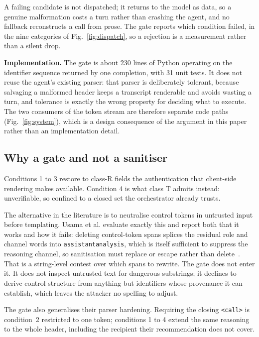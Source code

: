 \documentclass[conference]{IEEEtran}
\newcommand{\hmtok}[1]{\texttt{\textless\textbar#1\textbar\textgreater}}
\begin{document}
A failing candidate is not dispatched; it returns to the model as data, so a
genuine malformation costs a turn rather than crashing the agent, and no
fallback reconstructs a call from prose. The gate reports which condition
failed, in the nine categories of Fig.~\ref{fig:dispatch}, so a rejection is a
measurement rather than a silent drop.

\textbf{Implementation.} The gate is about 230 lines of Python operating on the
identifier sequence returned by one completion, with 31 unit tests. It does
not reuse the agent's existing parser: that parser is deliberately tolerant,
because salvaging a malformed header keeps a transcript renderable and avoids
wasting a turn, and tolerance is exactly the wrong property for deciding what to
execute. The two consumers of the token stream are therefore separate code
paths (Fig.~\ref{fig:system}), which is a design consequence of the argument in
this paper rather than an implementation detail.

\subsection{Why a gate and not a sanitiser}

Conditions 1 to 3 restore to class-R fields the authentication that client-side
rendering makes available. Condition 4 is what class T admits instead:
unverifiable, so confined to a closed set the orchestrator already trusts.

The alternative in the literature is to neutralise control tokens in untrusted
input before templating. Usama et al. evaluate exactly this and report both that
it works and how it fails: deleting control-token spans splices the residual
role and channel words into \texttt{assistantanalysis}, which is itself
sufficient to suppress the reasoning channel, so sanitisation must replace or
escape rather than delete~\cite{usama2026controltoken}. That is a string-level
contest over which spans to rewrite. The gate does not enter it. It does not
inspect untrusted text for dangerous substrings; it declines to derive control
structure from anything but identifiers whose provenance it can establish, which
leaves the attacker no spelling to adjust.

The gate also generalises their parser hardening. Requiring the closing
\hmtok{call} is condition~2 restricted to one token; conditions 1 to 4 extend
the same reasoning to the whole header, including the recipient their
recommendation does not cover.
\end{document}
